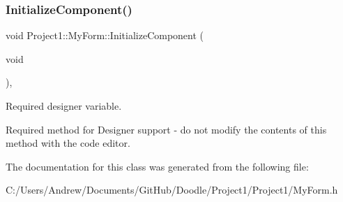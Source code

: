 \subsubsection{\texorpdfstring{Initialize\+Component()}{InitializeComponent()}}
{\footnotesize\ttfamily void Project1\+::\+My\+Form\+::\+Initialize\+Component (\begin{DoxyParamCaption}\item[{void}]{ }\end{DoxyParamCaption})\hspace{0.3cm}{\ttfamily [inline]}, {\ttfamily [private]}}



Required designer variable. 

Required method for Designer support -\/ do not modify the contents of this method with the code editor. 

The documentation for this class was generated from the following file\+:\begin{DoxyCompactItemize}
\item 
C\+:/\+Users/\+Andrew/\+Documents/\+Git\+Hub/\+Doodle/\+Project1/\+Project1/My\+Form.\+h\end{DoxyCompactItemize}

